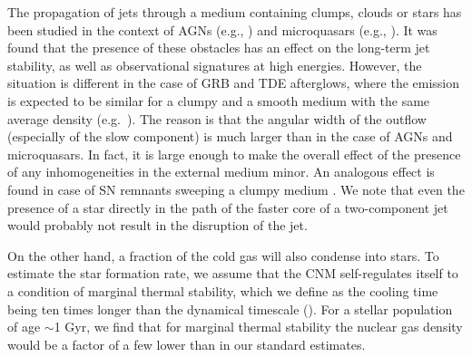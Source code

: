 \documentclass[usenatbib,fleqn]{mnras}
\begin{document}
The propagation of jets through a medium containing clumps, clouds or
stars has been studied in the context of AGNs (e.g.,
\citealt{WangWiita+2000, ChoiWiita+2007}) and microquasars (e.g.,
\citealt{Araudo+2009,Perucho+2012}). It was found that the presence of
these obstacles has an effect on the long-term jet stability, as well
as observational signatures at high energies. However, the situation
is different in the case of GRB and TDE afterglows, where the emission
is expected to be similar for a clumpy and a smooth medium with the
same average density
(e.g.~\citealt{Nakar&Granot2007,van-Eerten+2009,Mimica&Giannios2011}). The
reason is that the angular width of the outflow (especially of the
slow component) is much larger than in the case of AGNs and
microquasars. In fact, it is large enough to make the overall effect
of the presence of any inhomogeneities in the external medium
minor. An analogous effect is found in case of SN remnants sweeping a
clumpy medium \citep{Obergaulinger+2015}. We note that even the presence
of a star directly in the path of the faster core of a two-component
jet would probably not result in the disruption of the jet. 


On the other hand, a fraction of the cold gas will also condense into
stars.  To estimate the star formation rate, we assume that the CNM
self-regulates itself to a condition of marginal thermal stability,
which we define as the cooling time being ten times longer than the
dynamical timescale (\citealt{McCourt+2012}). For a stellar population
of age $\sim$1 Gyr, we find that for marginal thermal stability the
nuclear gas density would be a factor of a few lower than in our
standard estimates.
\end{document}
